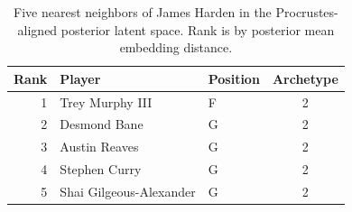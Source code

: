 \begin{table}[htbp]
  \centering\small
  \begin{tabular}{rllc}
    \toprule
    Rank & Player & Position & Archetype \\
    \midrule
    1 & Trey Murphy III & F & 2 \\
    2 & Desmond Bane & G & 2 \\
    3 & Austin Reaves & G & 2 \\
    4 & Stephen Curry & G & 2 \\
    5 & Shai Gilgeous-Alexander & G & 2 \\
    \bottomrule
  \end{tabular}
  \caption{Five nearest neighbors of James Harden in the Procrustes-aligned posterior latent space. Rank is by posterior mean embedding distance.}
  \label{tab:James_Harden_neighbors}
\end{table}

